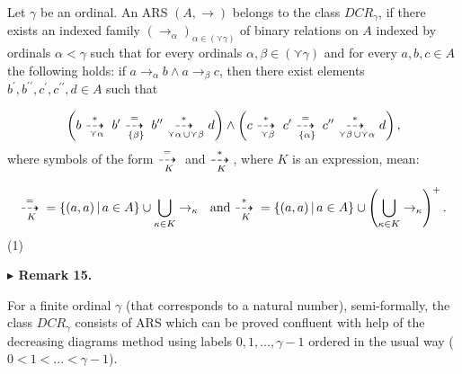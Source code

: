 \documentclass[10pt,a4paper]{amsart}
\begin{document}
Let $\gamma$ be an ordinal. An ARS $(A,\to)$ belongs to the class $DCR_{\gamma}$, if there exists an indexed family $(\to_{\alpha})_{\alpha\in(\curlyvee\gamma)}$ of binary relations on $A$ indexed by ordinals $\alpha<\gamma$ such that for every ordinals $\alpha,\beta\in(\curlyvee\gamma)$ and for every $a,b,c\in A$ the following holds: if $a\to_{\alpha}b\wedge a\to_{\beta}c$, then there exist elements $b^{\prime},b^{\prime\prime},c^{\prime},c^{\prime\prime},d\in A$ such that\par
    \[\left(b\leavevmode\nobreak\ {\mathop{\buildrel*\over{\dashrightarrow}\;}%
\limits_{\curlyvee\alpha}}\leavevmode\nobreak\ b^{\prime}\leavevmode\nobreak\ %
{\mathop{\buildrel=\over{\dashrightarrow}\;}\limits_{\{\beta\}}}\leavevmode%
\nobreak\ b^{\prime\prime}\leavevmode\nobreak\ {\mathop{\buildrel*\over{%
\dashrightarrow}\;}\limits_{\curlyvee\alpha\,\cup\curlyvee\beta}}\leavevmode%
\nobreak\ d\right)\wedge\left(c\leavevmode\nobreak\ {\mathop{\buildrel*\over{%
\dashrightarrow}\;}\limits_{\curlyvee\beta}}\leavevmode\nobreak\ c^{\prime}%
\leavevmode\nobreak\ {\mathop{\buildrel=\over{\dashrightarrow}\;}\limits_{\{%
\alpha\}}}\leavevmode\nobreak\ c^{\prime\prime}\leavevmode\nobreak\ {\mathop{%
\buildrel*\over{\dashrightarrow}\;}\limits_{\curlyvee\beta\,\cup\curlyvee%
\alpha}}\leavevmode\nobreak\ d\right),\]    
where symbols of the form ${\mathop{\buildrel=\over{\dashrightarrow}\;}\limits_{K}}$ and ${\mathop{\buildrel*\over{\dashrightarrow}\;}\limits_{K}}$, where $K$ is an expression, mean:\par
    \[{\mathop{\buildrel=\over{\dashrightarrow}\;}\limits_{K}}=\{(a,a)\,|\,a\in A\}%
\cup\bigcup_{\kappa\in K}\to_{\kappa}\text{ \leavevmode\nobreak\ and%
\leavevmode\nobreak\  }{\mathop{\buildrel*\over{\dashrightarrow}\;}\limits_{K}%
}=\{(a,a)\,|\,a\in A\}\cup\left(\bigcup_{\kappa\in K}\to_{\kappa}\right)^{+}.\]  (1)   
 
 
 
\par\medskip\noindent\textbf{$\blacktriangleright$ Remark 15.}\par
 
 
For a finite ordinal $\gamma$ (that corresponds to a natural number), semi-formally, the class $DCR_{\gamma}$ consists of ARS which can be proved confluent with help of the decreasing diagrams method using labels $0,1,...,\gamma-1$ ordered in the usual way ($0<1<...<\gamma-1$).\par
 
\end{document}
